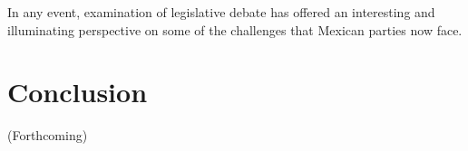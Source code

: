 \documentclass[letter,12pt]{article}
\begin{document}
In any event, examination of legislative debate has offered an interesting and illuminating perspective on some of the challenges that Mexican parties now face.   

\section{Conclusion} %

(Forthcoming)









\end{document}
